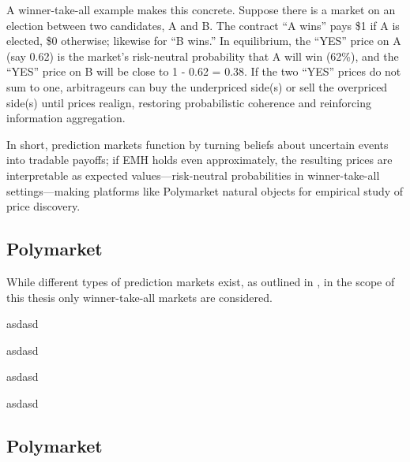 A winner-take-all example makes this concrete. Suppose there is a market on an election between two candidates, A and B. The contract “A wins” pays \$1 if A is elected, \$0 otherwise; likewise for “B wins.” In equilibrium, the “YES” price on A (say 0.62) is the market’s risk-neutral probability that A will win (62\%), and the “YES” price on B will be close to 1 - 0.62 = 0.38. If the two “YES” prices do not sum to one, arbitrageurs can buy the underpriced side(s) or sell the overpriced side(s) until prices realign, restoring probabilistic coherence and reinforcing information aggregation.


In short, prediction markets function by turning beliefs about uncertain events into tradable payoffs; if EMH holds even approximately, the resulting prices are interpretable as expected values—risk-neutral probabilities in winner-take-all settings—making platforms like Polymarket natural objects for empirical study of price discovery.

\subsection{Polymarket}

While different types of prediction markets exist, as outlined in \cite{wolfers_prediction_2004}, in the scope of this thesis only winner-take-all markets are considered.

asdasd
\cite{snowberg_partisan_2007}


asdasd
\cite{wolfers_prediction_2004}


asdasd
\cite{PMDocs}

asdasd
\cite{CTFExchange}



\subsection{Polymarket}



